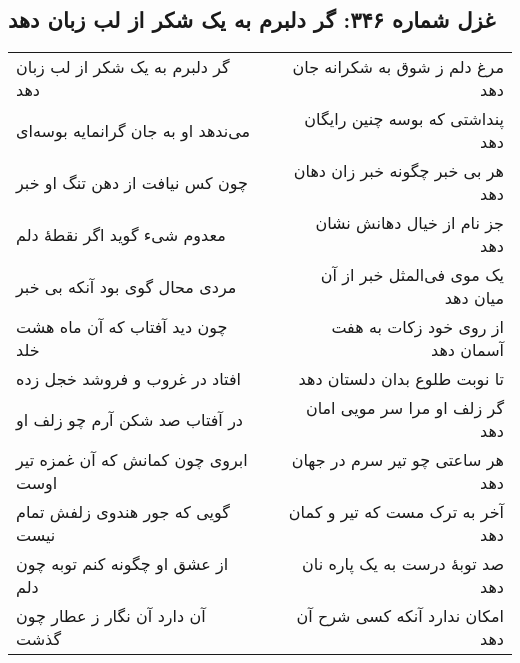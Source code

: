 \begin{center}
\section*{غزل شماره ۳۴۶: گر دلبرم به یک شکر از لب زبان دهد}
\label{sec:346}
\begin{longtable}{l p{0.5cm} r}
گر دلبرم به یک شکر از لب زبان دهد
&&
مرغ دلم ز شوق به شکرانه جان دهد
\\
می‌ندهد او به جان گرانمایه بوسه‌ای
&&
پنداشتی که بوسه چنین رایگان دهد
\\
چون کس نیافت از دهن تنگ او خبر
&&
هر بی خبر چگونه خبر زان دهان دهد
\\
معدوم شیء گوید اگر نقطهٔ دلم
&&
جز نام از خیال دهانش نشان دهد
\\
مردی محال گوی بود آنکه بی خبر
&&
یک موی فی‌المثل خبر از آن میان دهد
\\
چون دید آفتاب که آن ماه هشت خلد
&&
از روی خود زکات به هفت آسمان دهد
\\
افتاد در غروب و فروشد خجل زده
&&
تا نوبت طلوع بدان دلستان دهد
\\
در آفتاب صد شکن آرم چو زلف او
&&
گر زلف او مرا سر مویی امان دهد
\\
ابروی چون کمانش که آن غمزه تیر اوست
&&
هر ساعتی چو تیر سرم در جهان دهد
\\
گویی که جور هندوی زلفش تمام نیست
&&
آخر به ترک مست که تیر و کمان دهد
\\
از عشق او چگونه کنم توبه چون دلم
&&
صد توبهٔ درست به یک پاره نان دهد
\\
آن دارد آن نگار ز عطار چون گذشت
&&
امکان ندارد آنکه کسی شرح آن دهد
\\
\end{longtable}
\end{center}
